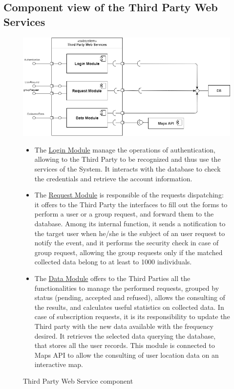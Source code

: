 \subsection{Component view of the Third Party Web Services}
\begin{figure}[H]
    \centering
    \includegraphics[scale=0.4]{DD/Pictures/ThirdPartyServiceDiagram(1).png}
    \caption{Third Party Web Service component}
    

\begin{itemize}
\item  The \underline{Login Module} manage the operations of authentication, allowing to the Third Party to be recognized and thus use the services of the System. It interacts with the database to check the credentials and retrieve the account information.

    \item The \underline{Request Module} is responsible of
    the requests dispatching: it offers to the Third Party the interfaces to fill out the forms to perform a user or a group request, and  forward them to the database. Among its internal function, it sends a notification to the target user when he/she is the subject of an user request to notify the event, and it performs the security check in case of group request, allowing the group requests only if the matched collected data belong to at least to 1000 individuals.
    
    \item The \underline{Data Module}  offers to the Third Parties all the functionalities to manage the performed requests, grouped by status (pending, accepted and refused), allows the consulting of the results, and calculates useful statistics on collected data. In case of subscription requests, it is its responsibility to update the Third party with the new data available with the frequency desired. It retrieves the selected data querying the database, that stores all the user records.
    This module is connected to Maps API to allow the consulting of user location data on an interactive map.
    
    
   \end{itemize} 
   
    
\end{figure}
